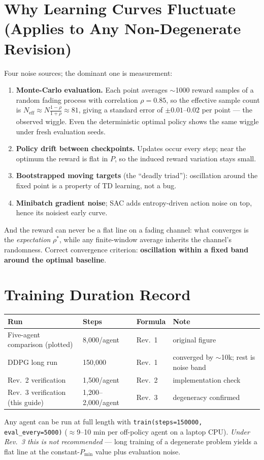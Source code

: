 \documentclass[11pt]{article}
\begin{document}
\section{Why Learning Curves Fluctuate (Applies to Any Non-Degenerate Revision)}
Four noise sources; the dominant one is measurement:
\begin{enumerate}[nosep]
\item \textbf{Monte-Carlo evaluation.} Each point averages $\sim$1000 reward samples of a random
fading process with correlation $\rho=0.85$, so the effective sample count is
$N_{\mathrm{eff}}\approx N\frac{1-\rho}{1+\rho}\approx 81$, giving a standard error of
$\pm 0.01$--$0.02$ per point --- the observed wiggle. Even the deterministic optimal policy shows
the same wiggle under fresh evaluation seeds.
\item \textbf{Policy drift between checkpoints.} Updates occur every step; near the optimum the
reward is flat in $P$, so the induced reward variation stays small.
\item \textbf{Bootstrapped moving targets} (the ``deadly triad''): oscillation around the fixed
point is a property of TD learning, not a bug.
\item \textbf{Minibatch gradient noise}; SAC adds entropy-driven action noise on top, hence its
noisiest early curve.
\end{enumerate}
And the reward can never be a flat line on a fading channel: what converges is the
\emph{expectation} $\rho^\ast$, while any finite-window average inherits the channel's
randomness. Correct convergence criterion: \textbf{oscillation within a fixed band around the
optimal baseline}.

\section{Training Duration Record}
\begin{center}
\renewcommand{\arraystretch}{1.25}
\begin{tabular}{@{}llll@{}}
\toprule
\textbf{Run} & \textbf{Steps} & \textbf{Formula} & \textbf{Note}\\
\midrule
Five-agent comparison (plotted) & 8{,}000/agent & Rev.~1 & original figure\\
DDPG long run & 150{,}000 & Rev.~1 & converged by ${\sim}$10k; rest is noise band\\
Rev.~2 verification & 1{,}500/agent & Rev.~2 & implementation check\\
Rev.~3 verification (this guide) & 1{,}200--2{,}000/agent & Rev.~3 & degeneracy confirmed\\
\bottomrule
\end{tabular}
\end{center}
Any agent can be run at full length with \texttt{train(steps=150000, eval\_every=5000)}
($\approx$9--10 min per off-policy agent on a laptop CPU). \emph{Under Rev.~3 this is not
recommended} --- long training of a degenerate problem yields a flat line at the constant-$P_{\min}$
value plus evaluation noise.
\end{document}
